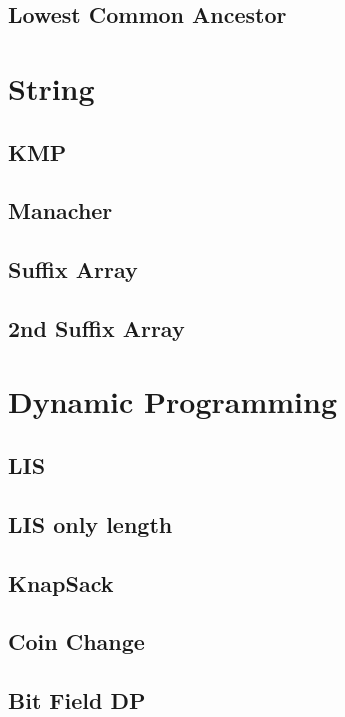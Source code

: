 \documentclass[10pt,landscape,a4paper,twocolumn]{article}
\begin{document}
\subsection{Lowest Common Ancestor}


\section{String}
\subsection{KMP}


\subsection{Manacher}


\subsection{Suffix Array}


\subsection{2nd Suffix Array}


\section {Dynamic Programming}

\subsection{LIS}


\subsection{LIS only length}


\subsection{KnapSack}


\subsection{Coin Change}


\subsection{Bit Field DP}

\end{document}
